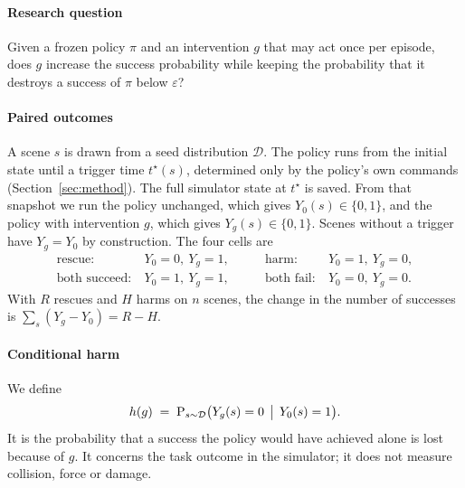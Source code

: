 \documentclass[preprint,12pt]{elsarticle}
\renewcommand{\Pr}{\operatorname{P}}
\begin{document}
\paragraph{Research question} Given a frozen policy $\pi$ and an intervention $g$ that may act once per episode, does $g$ increase the success probability while keeping the probability that it destroys a success of $\pi$ below $\varepsilon$?

\paragraph{Paired outcomes} A scene $s$ is drawn from a seed distribution $\mathcal{D}$. The policy runs from the initial state until a trigger time $t^\star(s)$, determined only by the policy's own commands (Section~\ref{sec:method}). The full simulator state at $t^\star$ is saved. From that snapshot we run the policy unchanged, which gives $Y_0(s)\in\{0,1\}$, and the policy with intervention $g$, which gives $Y_g(s)\in\{0,1\}$. Scenes without a trigger have $Y_g=Y_0$ by construction. The four cells are
\begin{equation}
\begin{aligned}
\text{rescue}: &\ Y_0=0,\ Y_g=1, & \qquad \text{harm}: &\ Y_0=1,\ Y_g=0,\\
\text{both succeed}: &\ Y_0=1,\ Y_g=1, & \qquad \text{both fail}: &\ Y_0=0,\ Y_g=0.
\end{aligned}
\end{equation}
With $R$ rescues and $H$ harms on $n$ scenes, the change in the number of successes is $\sum_s (Y_g-Y_0)=R-H$.

\paragraph{Conditional harm} We define
\begin{equation}
h(g) \;=\; \Pr_{s\sim\mathcal{D}}\bigl(Y_g(s)=0 \,\bigm|\, Y_0(s)=1\bigr).
\end{equation}
It is the probability that a success the policy would have achieved alone is lost because of $g$. It concerns the task outcome in the simulator; it does not measure collision, force or damage.
\end{document}
